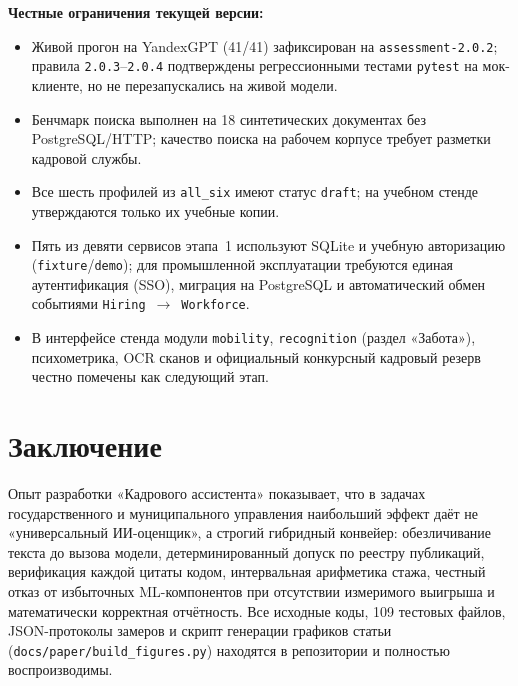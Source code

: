 \documentclass[10pt,a4paper,twocolumn]{article}
\newcommand{\code}[1]{\texttt{#1}}
\begin{document}
\textbf{Честные ограничения текущей версии:}
\begin{itemize}
  \item Живой прогон на YandexGPT (41/41) зафиксирован на \code{assessment-2.0.2}; правила
    \code{2.0.3}--\code{2.0.4} подтверждены регрессионными тестами \code{pytest} на мок-клиенте,
    но не перезапускались на живой модели.
  \item Бенчмарк поиска выполнен на 18 синтетических документах без PostgreSQL/HTTP; качество
    поиска на рабочем корпусе требует разметки кадровой службы.
  \item Все шесть профилей из \code{all\_six} имеют статус \code{draft}; на учебном стенде
    утверждаются только их учебные копии.
  \item Пять из девяти сервисов этапа~1 используют SQLite и учебную авторизацию
    (\code{fixture}/\code{demo}); для промышленной эксплуатации требуются единая
    аутентификация (SSO), миграция на PostgreSQL и автоматический обмен событиями
    \code{Hiring}~$\to$~\code{Workforce}.
  \item В интерфейсе стенда модули \code{mobility}, \code{recognition} (раздел «Забота»),
    психометрика, OCR сканов и официальный конкурсный кадровый резерв честно помечены как
    следующий этап.
\end{itemize}

\section{Заключение}

Опыт разработки «Кадрового ассистента» показывает, что в задачах государственного и
муниципального управления наибольший эффект даёт не «универсальный ИИ-оценщик», а строгий
гибридный конвейер: обезличивание текста до вызова модели, детерминированный допуск по реестру
публикаций, верификация каждой цитаты кодом, интервальная арифметика стажа, честный отказ от
избыточных ML-компонентов при отсутствии измеримого выигрыша и математически корректная
отчётность. Все исходные коды, 109 тестовых файлов, JSON-протоколы замеров и скрипт генерации
графиков статьи (\code{docs/paper/build\_figures.py}) находятся в репозитории и полностью
воспроизводимы.
\end{document}
